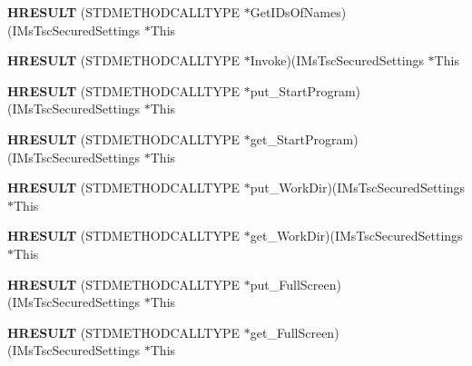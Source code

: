\begin{DoxyCompactItemize}
{\bfseries H\+R\+E\+S\+U\+LT} (S\+T\+D\+M\+E\+T\+H\+O\+D\+C\+A\+L\+L\+T\+Y\+PE $\ast$Get\+I\+Ds\+Of\+Names)(I\+Ms\+Tsc\+Secured\+Settings $\ast$This
\item 
\mbox{\label{struct_i_ms_tsc_secured_settings_vtbl_ad51395ce8332187280a1623f354d9e93}} 
{\bfseries H\+R\+E\+S\+U\+LT} (S\+T\+D\+M\+E\+T\+H\+O\+D\+C\+A\+L\+L\+T\+Y\+PE $\ast$Invoke)(I\+Ms\+Tsc\+Secured\+Settings $\ast$This
\item 
\mbox{\label{struct_i_ms_tsc_secured_settings_vtbl_af2893437ee2f589a8e88a3fb8e4a71e9}} 
{\bfseries H\+R\+E\+S\+U\+LT} (S\+T\+D\+M\+E\+T\+H\+O\+D\+C\+A\+L\+L\+T\+Y\+PE $\ast$put\+\_\+\+Start\+Program)(I\+Ms\+Tsc\+Secured\+Settings $\ast$This
\item 
\mbox{\label{struct_i_ms_tsc_secured_settings_vtbl_aec6cdd76de6759fe12fa7659354c7ba4}} 
{\bfseries H\+R\+E\+S\+U\+LT} (S\+T\+D\+M\+E\+T\+H\+O\+D\+C\+A\+L\+L\+T\+Y\+PE $\ast$get\+\_\+\+Start\+Program)(I\+Ms\+Tsc\+Secured\+Settings $\ast$This
\item 
\mbox{\label{struct_i_ms_tsc_secured_settings_vtbl_ae57d039c4e527f091fc575977444135a}} 
{\bfseries H\+R\+E\+S\+U\+LT} (S\+T\+D\+M\+E\+T\+H\+O\+D\+C\+A\+L\+L\+T\+Y\+PE $\ast$put\+\_\+\+Work\+Dir)(I\+Ms\+Tsc\+Secured\+Settings $\ast$This
\item 
\mbox{\label{struct_i_ms_tsc_secured_settings_vtbl_a23fd36dc256bf214754d79ad46003bcf}} 
{\bfseries H\+R\+E\+S\+U\+LT} (S\+T\+D\+M\+E\+T\+H\+O\+D\+C\+A\+L\+L\+T\+Y\+PE $\ast$get\+\_\+\+Work\+Dir)(I\+Ms\+Tsc\+Secured\+Settings $\ast$This
\item 
\mbox{\label{struct_i_ms_tsc_secured_settings_vtbl_aa75127506fee16cf930f1c173a916f3d}} 
{\bfseries H\+R\+E\+S\+U\+LT} (S\+T\+D\+M\+E\+T\+H\+O\+D\+C\+A\+L\+L\+T\+Y\+PE $\ast$put\+\_\+\+Full\+Screen)(I\+Ms\+Tsc\+Secured\+Settings $\ast$This
\item 
\mbox{\label{struct_i_ms_tsc_secured_settings_vtbl_aeac146f05396d19833fad49d324554ea}} 
{\bfseries H\+R\+E\+S\+U\+LT} (S\+T\+D\+M\+E\+T\+H\+O\+D\+C\+A\+L\+L\+T\+Y\+PE $\ast$get\+\_\+\+Full\+Screen)(I\+Ms\+Tsc\+Secured\+Settings $\ast$This

\end{DoxyCompactItemize}
